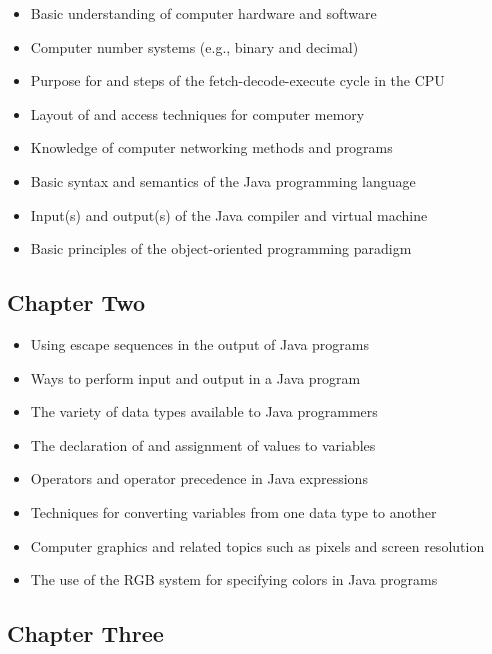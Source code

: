 \documentclass[11pt]{article}
\begin{document}
\begin{itemize}

  \item Basic understanding of computer hardware and software
  \item Computer number systems (e.g., binary and decimal)
  \item Purpose for and steps of the fetch-decode-execute cycle in the CPU
  \item Layout of and access techniques for computer memory
  \item Knowledge of computer networking methods and programs
  \item Basic syntax and semantics of the Java programming language
  \item Input(s) and output(s) of the Java compiler and virtual machine
  \item Basic principles of the object-oriented programming paradigm

\end{itemize}

\subsection*{Chapter Two}

\begin{itemize}

  \item Using escape sequences in the output of Java programs
  \item Ways to perform input and output in a Java program
  \item The variety of data types available to Java programmers
  \item The declaration of and assignment of values to variables
  \item Operators and operator precedence in Java expressions
  \item Techniques for converting variables from one data type to another
  \item Computer graphics and related topics such as pixels and screen resolution
  \item The use of the RGB system for specifying colors in Java programs

\end{itemize}

\subsection*{Chapter Three}
\end{document}
